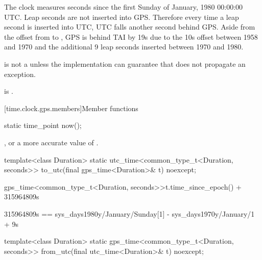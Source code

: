 \pnum
The clock  measures
seconds since the first Sunday of January, 1980 00:00:00 UTC.
Leap seconds are not inserted into GPS.
Therefore every time a leap second is inserted into UTC,
UTC falls another second behind GPS.
Aside from the offset from  to ,
GPS is behind TAI by 19s due to the 10s offset between 1958 and 1970
and the additional 9 leap seconds inserted between 1970 and 1980.

\pnum
{} is not a 
unless the implementation can guarantee that
 does not propagate an exception.
\begin{note}
 is .
\end{note}

[time.clock.gps.members]{Member functions}

%
\begin{itemdecl}
static time_point now();
\end{itemdecl}

\begin{itemdescr}
\pnum
\returns {}, or a more accurate value of .
\end{itemdescr}

%
\begin{itemdecl}
template<class Duration>
  static utc_time<common_type_t<Duration, seconds>>
    to_utc(final gps_time<Duration>& t) noexcept;
\end{itemdecl}

\begin{itemdescr}
\pnum
\returns
\begin{codeblock}
gps_time<common_type_t<Duration, seconds>>{t.time_since_epoch()} + 315964809s
\end{codeblock}
\begin{note}
\begin{codeblock}
315964809s == sys_days{1980y/January/Sunday[1]} - sys_days{1970y/January/1} + 9s
\end{codeblock}
\end{note}
\end{itemdescr}

%
\begin{itemdecl}
template<class Duration>
  static gps_time<common_type_t<Duration, seconds>>
    from_utc(final utc_time<Duration>& t) noexcept;
\end{itemdecl}

